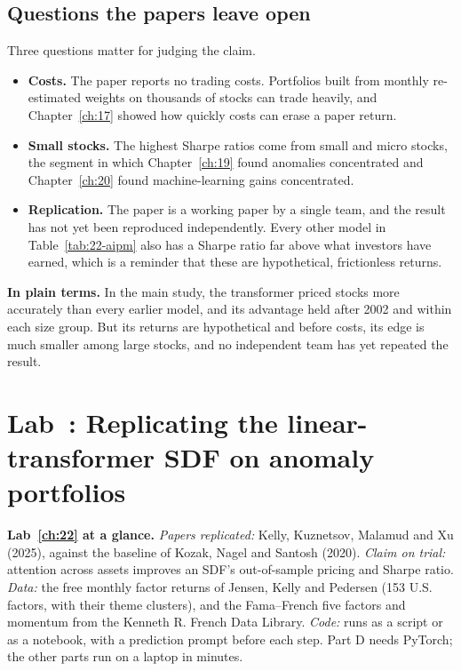 \subsection{Questions the papers leave open}

Three questions matter for judging the claim.

\begin{itemize}
  \item \textbf{Costs.} The paper reports no trading costs. Portfolios built from monthly re-estimated weights on thousands of stocks can trade heavily, and Chapter~\ref{ch:17} showed how quickly costs can erase a paper return.
  \item \textbf{Small stocks.} The highest Sharpe ratios come from small and micro stocks, the segment in which Chapter~\ref{ch:19} found anomalies concentrated and Chapter~\ref{ch:20} found machine-learning gains concentrated.
  \item \textbf{Replication.} The paper is a working paper by a single team, and the result has not yet been reproduced independently. Every other model in Table~\ref{tab:22-aipm} also has a Sharpe ratio far above what investors have earned, which is a reminder that these are hypothetical, frictionless returns.
\end{itemize}

\noindent\textbf{In plain terms.} In the main study, the transformer priced stocks more accurately than every earlier model, and its advantage held after 2002 and within each size group. But its returns are hypothetical and before costs, its edge is much smaller among large stocks, and no independent team has yet repeated the result.

\section{Lab~\thechapter: Replicating the linear-transformer SDF on anomaly portfolios}
\label{sec:22-lab}

\begin{callout}
\textbf{Lab~\ref{ch:22} at a glance.} \emph{Papers replicated:} Kelly, Kuznetsov, Malamud and Xu (2025), against the baseline of Kozak, Nagel and Santosh (2020). \emph{Claim on trial:} attention across assets improves an SDF's out-of-sample pricing and Sharpe ratio. \emph{Data:} the free monthly factor returns of Jensen, Kelly and Pedersen (153 U.S. factors, with their theme clusters), and the Fama--French five factors and momentum from the Kenneth R. French Data Library. \emph{Code:} runs as a script or as a notebook, with a prediction prompt before each step. Part D needs PyTorch; the other parts run on a laptop in minutes.
\end{callout}

